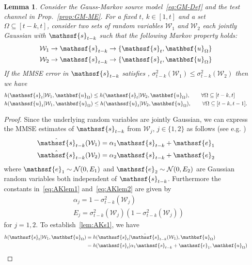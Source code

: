 \documentclass[journal, twocolumn, 10pt]{IEEEtran}
\newtheorem{lemma}{Lemma}
\newcommand{\cN}{{\mathcal{N}}}
\newcommand{\cW}{{\mathcal{W}}}
\newcommand{\al}{\alpha}
\newcommand{\rve}{{\mathssf{e}}}    %
\newcommand{\rvs}{{\mathssf{s}}}    %
\newcommand{\rvu}{{\mathssf{u}}}    %
\newcommand{\rvbu}{{\mathbsf{u}}}
\begin{document}
{\begin{lemma}
\label{lem:AKSuggest}
Consider the Gauss-Markov source model~\eqref{eq:GM-Def} and the test channel in Prop.~\ref{prop:GM-ME}.
For a fixed $t$, $k\in[1, t]$ and a set $\Omega \subseteq [t-k,t]$, consider two sets of random variables $\cW_1$ and $\cW_{2}$ each  jointly Gaussian with $\rvs_{t-k}$  such that the following Markov property holds:
\begin{align}
&\cW_1 \rightarrow \rvs_{t-k} \rightarrow \{\rvs_{t}, \rvbu_{\Omega}\}\\
&\cW_2 \rightarrow \rvs_{t-k} \rightarrow \{\rvs_{t}, \rvbu_{\Omega}\}
\end{align} If the MMSE error in $\rvs_{t-k}$ satisfies , $\sigma^2_{t-k}(\cW_1)\le \sigma^2_{t-k}(\cW_2)$ then we have
\begin{align}
&h(\rvs_{t} | \cW_1, \rvbu_{\Omega}) \le h(\rvs_{t} | \cW_2, \rvbu_{\Omega}), \qquad \forall \Omega \subseteq [t-k,t] \label{lem:AKs1}\\
&h(\rvu_{t} | \cW_1, \rvbu_{\Omega}) \le h(\rvu_{t} | \cW_2, \rvbu_{\Omega}), \qquad \forall \Omega \subseteq [t-k,t-1] \label{lem:AKs2}.
\end{align}
\end{lemma}
\begin{proof}
Since the underlying random variables are jointly Gaussian, we can express the MMSE estimates of $\rvs_{t-k}$ from $\cW_j$, $j\in\{1,2\}$ as follows (see e.g. \cite{willskyWornel03})
\begin{align}
&\hat{\rvs}_{t-k}(\cW_1) = \alpha_1 \rvs_{t-k} +\rve_1 \label{eq:AKlem1}\\
&\hat{\rvs}_{t-k}(\cW_2) = \alpha_2 \rvs_{t-k} +\rve_2 \label{eq:AKlem2}
\end{align} where $\rve_1 \sim \cN(0, E_1)$ and $\rve_2 \sim \cN(0, E_2)$ are  Gaussian  random variables both independent of $\rvs_{t-k}$. Furthermore the constants in~\eqref{eq:AKlem1} and~\eqref{eq:AKlem2} are given by 
\begin{align}
&\al_j = 1-\sigma^2_{t-k}(\cW_j)\\
& E_j = \sigma^2_{t-k}(\cW_j)(1-\sigma^2_{t-k}(\cW_j))
\end{align} for $j=1,2$. To establish~\eqref{lem:AKs1}, we have
\begin{align}
h(\rvs_{t} | \cW_1, \rvbu_{\Omega}) &= h(\rvs_{t} | \hat{\rvs}_{t-k}(\cW_1), \rvbu_{\Omega})\label{eq:Ak1}\\
 & = h(\rvs_{t} | \alpha_1 \rvs_{t-k} +\rve_1, \rvbu_{\Omega}) \label{eq:Ak2}\\

\end{align}
\end{proof}}
\end{document}
